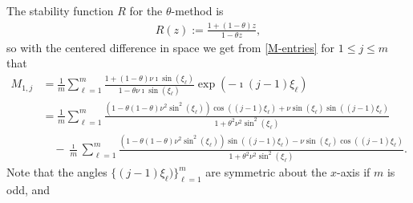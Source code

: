 \documentclass[a4paper]{article}
\begin{document}
%
The stability function $R$ for the $\theta$-method \cite[Chapter IV.3]{hairerwanner} is
\begin{align}\label{R}
    R(z)  := \frac{1+(1-\theta)z}{1-\theta z},
\end{align}
so with the centered difference in space we get from \eqref{M-entries} for $1\le j\le m$ that
\begin{equation}\label{matrix_entries}
\begin{split}
	M_{1,j} &= \frac{1}{m} \sum_{\ell=1}^m \frac{1+(1-\theta)\nu \imath\sin(\xi_\ell)}
		{1-\theta\nu \imath\sin(\xi_\ell)}\exp\left(-\imath(j-1)\xi_\ell\right) \\
		&= \frac{1}{m} \sum_{\ell=1}^{m} \frac{\left(1-\theta(1-\theta)\nu^2\sin^2(\xi_\ell)\right)
		\cos((j-1)\xi_\ell) + \nu \sin(\xi_\ell)\sin((j-1)\xi_\ell)}{1+\theta^2\nu^2 \sin^2(\xi_\ell)} \\
		&\quad - \frac{\imath}{m} \sum_{\ell=1}^{m} \frac{\left(1-\theta(1-\theta)\nu^2\sin^2(\xi_\ell)
		\right)\sin((j-1)\xi_\ell) - \nu \sin(\xi_\ell)\cos((j-1)\xi_\ell)}
		{1+\theta^2\nu^2 \sin^2(\xi_\ell)}.
\end{split}
\end{equation}
Note that the angles $\{(j-1)\xi_\ell)\}_{\ell=1}^m$ are symmetric about the $x$-axis if $m$ is odd, and
\end{document}
